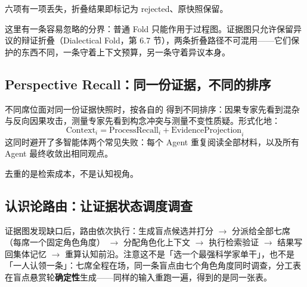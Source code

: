 六项有一项丢失，折叠结果即标记为 rejected、原快照保留。

这里有一条容易忽略的分界：普通 Fold 只能作用于过程图。证据图只允许保留异议的辩证折叠（Dialectical Fold，第 6.7 节），两条折叠路径不可混用——它们保护的东西不同，一条守着上下文预算，另一条守着异议本身。

\subsection{Perspective Recall：同一份证据，不同的排序}

不同席位面对同一份证据快照时，按各自的  得到不同排序：因果专家先看到混杂与反向因果攻击，测量专家先看到构念冲突与测量不变性质疑。形式化地：
\[
\text{Context}_i = \text{ProcessRecall}_i + \text{EvidenceProjection}_i
\]
这同时避开了多智能体两个常见失败：每个 Agent 重复阅读全部材料，以及所有 Agent 最终收敛出相同观点。

去重的是检索成本，不是认知视角。

\subsection{认识论路由：让证据状态调度调查}

证据图发现缺口后，路由依次执行：生成盲点候选并打分 $\rightarrow$ 分派给全部七席（每席一个固定角色角度） $\rightarrow$ 分配角色化上下文 $\rightarrow$ 执行检索验证 $\rightarrow$ 结果写回集体记忆 $\rightarrow$ 重算认知前沿。注意这不是「选一个最强科学家单干」，也不是「一人认领一条」：七席全程在场，同一条盲点由七个角色角度同时调查，分工表在盲点悬赏轮\textbf{确定性}生成——同样的输入重跑一遍，得到的是同一张表。
